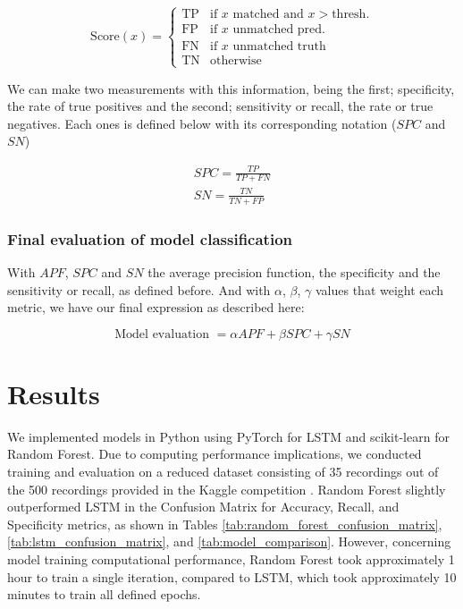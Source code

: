 \documentclass{article}
\begin{document}
\[
\text{Score}(x) = 
\begin{cases} 
\text{TP} & \text{if }x \text{ matched and } x > \text{thresh.} \\
\text{FP} & \text{if }x \text{ unmatched pred.} \\
\text{FN} & \text{if }x \text{ unmatched truth} \\
\text{TN} & \text{otherwise}
\end{cases}
\]

We can make two measurements with this information, being the first; specificity, the rate of true positives and the second; sensitivity or recall, the rate or true negatives. Each ones is defined below with its corresponding notation ($SPC$ and $SN$)

\begin{gather}
  SPC = \frac{TP}{TP + FN} \\
  SN = \frac{TN}{TN + FP}
\end{gather}

\subsubsection{Final evaluation of model classification}

With $APF$, $SPC$ and $SN$ the average precision function, the specificity and the sensitivity or recall, as defined before. And with $\alpha$, $\beta$, $\gamma$ values that weight each metric, we have our final expression as described here:

\begin{equation*}
\text{Model evaluation } = \alpha APF + \beta SPC + \gamma SN 
\end{equation*}

\vspace{.5em}



\section{Results}

We implemented models in Python using PyTorch for LSTM and scikit-learn for Random Forest. Due to computing performance implications, we conducted training and evaluation on a reduced dataset consisting of 35 recordings out of the 500 recordings provided in the Kaggle competition \cite{child-mind-institute-detect-sleep-states}. Random Forest slightly outperformed LSTM in the Confusion Matrix for Accuracy, Recall, and Specificity metrics, as shown in Tables \ref{tab:random_forest_confusion_matrix}, \ref{tab:lstm_confusion_matrix}, and \ref{tab:model_comparison}. However, concerning model training computational performance, Random Forest took approximately 1 hour to train a single iteration, compared to LSTM, which took approximately 10 minutes to train all defined epochs.
\end{document}
